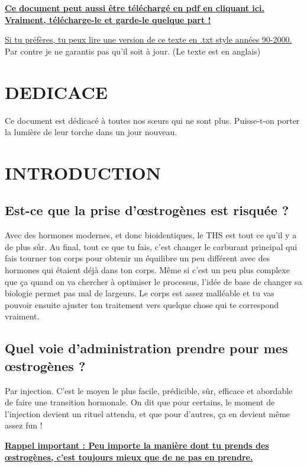 \documentclass{article}
\begin{document}
\noindent\textbf{\href{PDF_LINK}{Ce document peut aussi être téléchargé en pdf en cliquant ici. Vraiment, télécharge-le et garde-le quelque part !}}

\noindent\href{https://pghrt.diy/pghrtgretchensversion.txt}{Si tu préfères, tu peux lire une version de ce texte en .txt style années 90-2000.} Par contre je ne garantis pas qu'il soit à jour. (Le texte est en anglais)



\section*{DEDICACE}

Ce document est dédicacé à toutes nos sœurs qui ne sont plus. Puisse-t-on porter la lumière de leur torche dans un jour nouveau.

\section{INTRODUCTION}

\subsection{Est-ce que la prise d'œstrogènes est risquée ?}

Avec des hormones modernes, et donc bioidentiques, le THS est tout ce qu'il y a de plus sûr. Au final, tout ce que tu fais, c'est changer le carburant principal qui fais tourner ton corps pour obtenir un équilibre un peu différent avec des hormones qui étaient déjà dans ton corps. Même si c'est un peu plus complexe que ça quand on va chercher à optimiser le processus, l'idée de base de changer sa biologie permet pas mal de largeurs. Le corps est assez malléable et tu vas pouvoir ensuite ajuster ton traitement vers quelque chose qui te correspond vraiment.

\subsection{Quel voie d'administration prendre pour mes œstrogènes ?}

Par injection. C'est le moyen le plus facile, prédicible, sûr, efficace et abordable de faire une transition hormonale. On dit que pour certains, le moment de l'injection devient un rituel attendu, et que pour d'autres, ça en devient même assez fun !

\noindent\underline{\textbf{Rappel important : Peu importe la manière dont tu prends des œstrogènes, c'est toujours mieux que de ne pas en prendre.}}
\end{document}
